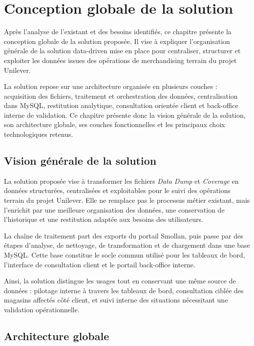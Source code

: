 \chapter{Conception globale de la solution}

Après l’analyse de l’existant et des besoins identifiés, ce chapitre présente la conception globale de la solution proposée. Il vise à expliquer l’organisation générale de la solution data-driven mise en place pour centraliser, structurer et exploiter les données issues des opérations de merchandising terrain du projet Unilever.

La solution repose sur une architecture organisée en plusieurs couches : acquisition des fichiers, traitement et orchestration des données, centralisation dans MySQL, restitution analytique, consultation orientée client et back-office interne de validation. Ce chapitre présente donc la vision générale de la solution, son architecture globale, ses couches fonctionnelles et les principaux choix technologiques retenus.

\section{Vision générale de la solution}

La solution proposée vise à transformer les fichiers \textit{Data Dump} et \textit{Coverage} en données structurées, centralisées et exploitables pour le suivi des opérations terrain du projet Unilever. Elle ne remplace pas le processus métier existant, mais l’enrichit par une meilleure organisation des données, une conservation de l’historique et une restitution adaptée aux besoins des utilisateurs.

La chaîne de traitement part des exports du portail Smollan, puis passe par des étapes d’analyse, de nettoyage, de transformation et de chargement dans une base MySQL. Cette base constitue le socle commun utilisé pour les tableaux de bord, l’interface de consultation client et le portail back-office interne.

Ainsi, la solution distingue les usages tout en conservant une même source de données : pilotage interne à travers les tableaux de bord, consultation ciblée des magasins affectés côté client, et suivi interne des situations nécessitant une validation opérationnelle.

\section{Architecture globale}

